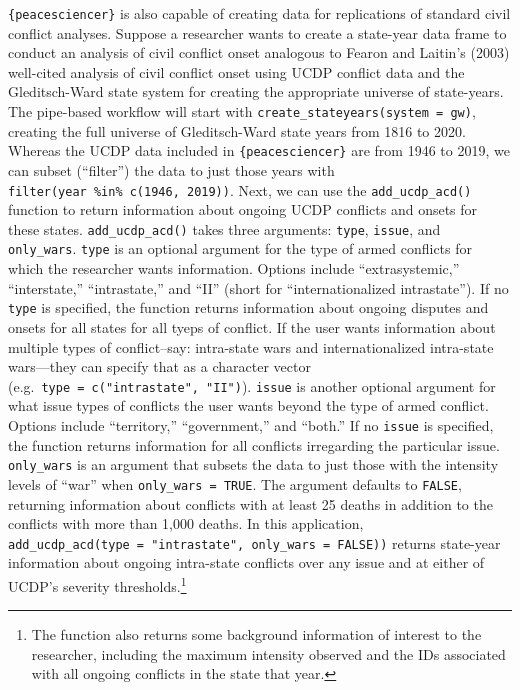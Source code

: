 \documentclass[
  11pt,
]{article}
\begin{document}
\texttt{\{peacesciencer\}} is also capable of creating data for replications of standard civil conflict analyses. Suppose a researcher wants to create a state-year data frame to conduct an analysis of civil conflict onset analogous to Fearon and Laitin's (2003) well-cited analysis of civil conflict onset using UCDP conflict data and the Gleditsch-Ward state system for creating the appropriate universe of state-years. The pipe-based workflow will start with \texttt{create\_stateyears(system\ =\ \textquotesingle{}gw\textquotesingle{})}, creating the full universe of Gleditsch-Ward state years from 1816 to 2020. Whereas the UCDP data included in \texttt{\{peacesciencer\}} are from 1946 to 2019, we can subset (``filter'') the data to just those years with \texttt{filter(year\ \%in\%\ c(1946,\ 2019))}. Next, we can use the \texttt{add\_ucdp\_acd()} function to return information about ongoing UCDP conflicts and onsets for these states. \texttt{add\_ucdp\_acd()} takes three arguments: \texttt{type}, \texttt{issue}, and \texttt{only\_wars}. \texttt{type} is an optional argument for the type of armed conflicts for which the researcher wants information. Options include ``extrasystemic,'' ``interstate,'' ``intrastate,'' and ``II'' (short for ``internationalized intrastate''). If no \texttt{type} is specified, the function returns information about ongoing disputes and onsets for all states for all tyeps of conflict. If the user wants information about multiple types of conflict--say: intra-state wars and internationalized intra-state wars---they can specify that as a character vector (e.g.~\texttt{type\ =\ c("intrastate",\ "II")}). \texttt{issue} is another optional argument for what issue types of conflicts the user wants beyond the type of armed conflict. Options include ``territory,'' ``government,'' and ``both.'' If no \texttt{issue} is specified, the function returns information for all conflicts irregarding the particular issue. \texttt{only\_wars} is an argument that subsets the data to just those with the intensity levels of ``war'' when \texttt{only\_wars\ =\ TRUE}. The argument defaults to \texttt{FALSE}, returning information about conflicts with at least 25 deaths in addition to the conflicts with more than 1,000 deaths. In this application, \texttt{add\_ucdp\_acd(type\ =\ "intrastate",\ only\_wars\ =\ FALSE))} returns state-year information about ongoing intra-state conflicts over any issue and at either of UCDP's severity thresholds.\footnote{The function also returns some background information of interest to the researcher, including the maximum intensity observed and the IDs associated with all ongoing conflicts in the state that year.}
\end{document}
